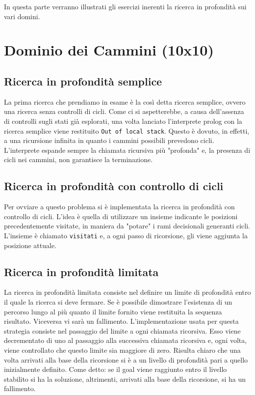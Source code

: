 In questa parte verranno illustrati gli esercizi inerenti la ricerca in profondità sui vari domini.

\section{Dominio dei Cammini (10x10)}

\subsection{Ricerca in profondità semplice} \label{sub:10-prof-semplice}
La prima ricerca che prendiamo in esame è la così detta ricerca semplice, ovvero una ricerca senza controlli di cicli. Come ci si aspetterebbe, a causa dell'assenza di controlli sugli stati già esplorati, una volta lanciato l'interprete prolog con la ricerca semplice viene restituito \texttt{Out of local stack}. Questo è dovuto, in effetti, a una ricursione infinita in quanto i cammini possibili prevedono cicli. L'interprete espande sempre la chiamata ricursiva più "profonda" e, la presenza di cicli nei cammini, non garantisce la terminazione.

\subsection{Ricerca in profondità con controllo di cicli} \label{sub:10-prof-cc}
Per ovviare a questo problema si è implementata la ricerca in profondità con controllo di cicli. L'idea è quella di utilizzare un insieme indicante le posizioni precedentemente visitate, in maniera da "potare" i rami decisionali generanti cicli. L'insieme è chiamato \texttt{visitati} e, a ogni passo di ricorsione, gli viene aggiunta la posizione attuale.

\subsection{Ricerca in profondità limitata} \label{sub:10-prof-limitata}
La ricerca in profondità limitata consiste nel definire un limite di profondità entro il quale la ricerca si deve fermare. Se è possibile dimostrare l'esistenza di un percorso lungo al più quanto il limite fornito viene restituita la sequenza risultato. Viceversa vi sarà un fallimento.
L'implementazione usata per questa strategia consiste nel passaggio del limite a ogni chiamata ricorsiva. Esso viene decrementato di uno al passaggio alla successiva chiamata ricorsiva e, ogni volta, viene controllato che questo limite sia maggiore di zero. Risulta chiaro che una volta arrivati alla base della ricorsione si è a un livello di profondità pari a quello inizialmente definito. Come detto: se il goal viene raggiunto entro il livello stabilito si ha la soluzione, altrimenti, arrivati alla base della ricorsione, si ha un fallimento.

